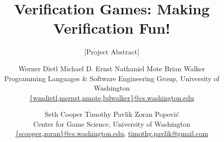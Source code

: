 \documentclass{sig-alternate}
\begin{document}
\title{Verification Games: Making Verification Fun!}

\subtitle{[Project Abstract]}


%
\author{
Werner Dietl
\qquad
Michael D. Ernst
\qquad
Nathaniel Mote
\qquad
Brian Walker\\
%
{\normalsize
Programming Languages \& Software Engineering Group,
University of Washington}\\
\url{{wmdietl,mernst,nmote,bdwalker}@cs.washington.edu}
%
\and
%
Seth Cooper
\qquad
Timothy Pavlik
\qquad
Zoran Popovi\'c\\
%
{\normalsize
Center for Game Science, University of Washington}\\
\url{{scooper,zoran}@cs.washington.edu},
\url{timothy.pavlik@gmail.com}
}
\end{document}
